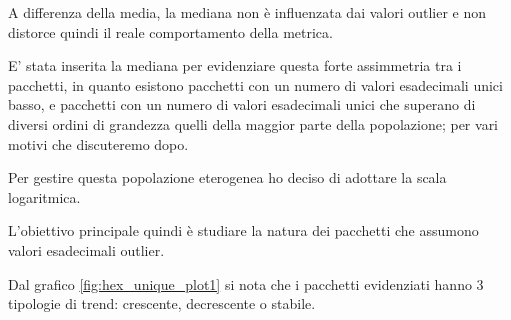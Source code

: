 A differenza della media, la mediana non è influenzata dai valori outlier e  
non distorce quindi il reale comportamento della metrica.

E' stata inserita la mediana per evidenziare questa forte assimmetria tra i pacchetti,
in quanto esistono pacchetti con un numero di valori esadecimali unici basso, e
pacchetti con un numero di valori esadecimali unici che superano di diversi ordini di grandezza
quelli della maggior parte della popolazione; per vari motivi che discuteremo dopo.


Per gestire questa popolazione eterogenea ho deciso di adottare la scala logaritmica.


L'obiettivo principale quindi è studiare la natura dei pacchetti che assumono valori esadecimali outlier.

Dal grafico \ref{fig:hex_unique_plot1} si nota che i pacchetti evidenziati
hanno 3 tipologie di trend: crescente, decrescente o stabile.

